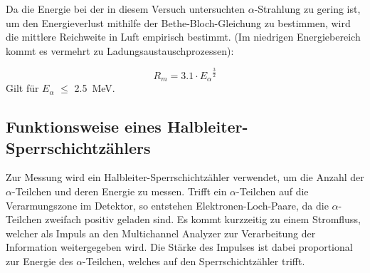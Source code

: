 Da die Energie bei der in diesem Versuch untersuchten $\alpha$-Strahlung zu gering ist, um den Energieverlust mithilfe der Bethe-Bloch-Gleichung zu bestimmen, wird die mittlere Reichweite in Luft empirisch bestimmt. (Im niedrigen Energiebereich kommt es vermehrt zu Ladungsaustauschprozessen):

\begin{equation}
\label{eq:reichweite}
R_m = 3.1 \cdot {E_\alpha} ^{\frac{3}{2}}
\end{equation}
Gilt für $E_{\alpha}$ $\le$ \SI{2.5}{\mega\electronvolt}.

\subsection{Funktionsweise eines Halbleiter-Sperrschichtzählers}

Zur Messung wird ein Halbleiter-Sperrschichtzähler verwendet, um
die Anzahl der $\alpha$-Teilchen und deren Energie zu messen. Trifft ein $\alpha$-Teilchen auf die Verarmungszone im Detektor, so entstehen Elektronen-Loch-Paare, da die $\alpha$-Teilchen zweifach positiv geladen sind. Es kommt kurzzeitig zu einem Stromfluss, welcher als Impuls an den Multichannel Analyzer zur Verarbeitung der Information weitergegeben wird. Die Stärke des Impulses ist dabei proportional zur Energie des $\alpha$-Teilchen, welches auf den Sperrschichtzähler trifft.
